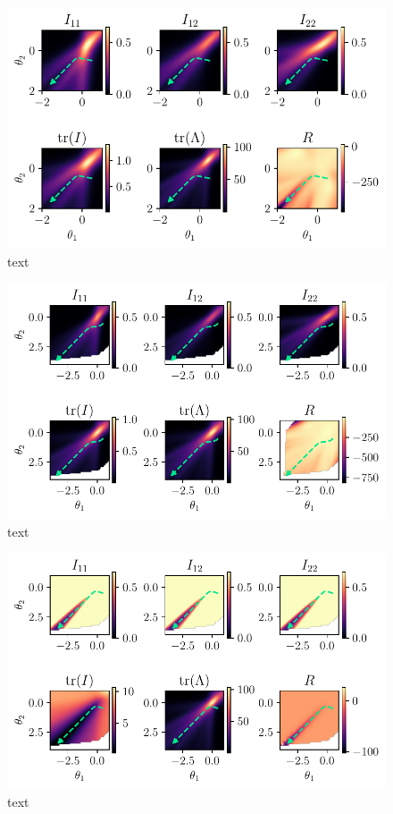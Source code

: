 \begin{figure}
	\centering
	\includegraphics{Experiment2/plots/MeanPowerLoss2_tracecomparison.pdf}
	\caption{text}
\end{figure}

\begin{figure}
	\centering
	\includegraphics{Experiment2/plots/LPNormLoss2_tracecomparison.pdf}
	\caption{text}
\end{figure}

\begin{figure}
	\centering
	\includegraphics{Experiment2/plots/CrossEntropyLoss_tracecomparison.pdf}
	\caption{text}
\end{figure}

